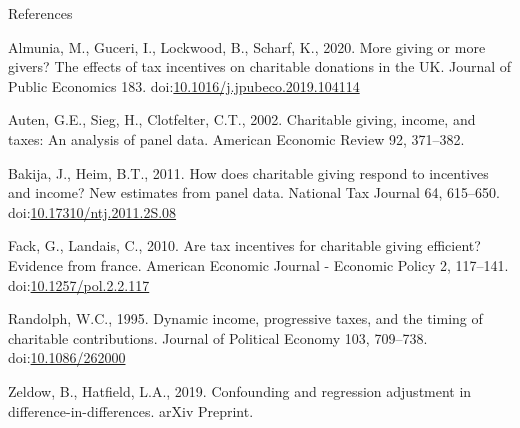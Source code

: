 \documentclass[
  ignorenonframetext,
]{beamer}
\newlength{\cslhangindent}
\newenvironment{CSLReferences}[2] %
 {%
  \setlength{\parindent}{0pt}
  \ifodd #1 \everypar{\setlength{\hangindent}{\cslhangindent}}\ignorespaces\fi
  \ifnum #2 > 0
  \setlength{\parskip}{#2\baselineskip}
  \fi
 }%
 {}
\begin{document}
\begin{frame}[allowframebreaks]{References}
\hypertarget{refs}{}
\begin{CSLReferences}{1}{0}
\leavevmode{}%
Almunia, M., Guceri, I., Lockwood, B., Scharf, K., 2020. More giving or more givers? The effects of tax incentives on charitable donations in the UK. Journal of Public Economics 183. doi:\href{https://doi.org/10.1016/j.jpubeco.2019.104114}{10.1016/j.jpubeco.2019.104114}

\leavevmode{}%
Auten, G.E., Sieg, H., Clotfelter, C.T., 2002. Charitable giving, income, and taxes: An analysis of panel data. American Economic Review 92, 371--382.

\leavevmode{}%
Bakija, J., Heim, B.T., 2011. How does charitable giving respond to incentives and income? New estimates from panel data. National Tax Journal 64, 615--650. doi:\href{https://doi.org/10.17310/ntj.2011.2S.08}{10.17310/ntj.2011.2S.08}

\leavevmode{}%
Fack, G., Landais, C., 2010. Are tax incentives for charitable giving efficient? Evidence from france. American Economic Journal - Economic Policy 2, 117--141. doi:\href{https://doi.org/10.1257/pol.2.2.117}{10.1257/pol.2.2.117}

\leavevmode{}%
Randolph, W.C., 1995. Dynamic income, progressive taxes, and the timing of charitable contributions. Journal of Political Economy 103, 709--738. doi:\href{https://doi.org/10.1086/262000}{10.1086/262000}

\leavevmode{}%
Zeldow, B., Hatfield, L.A., 2019. Confounding and regression adjustment in difference-in-differences. arXiv Preprint.

\end{CSLReferences}
\end{frame}
\end{document}
